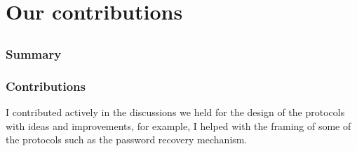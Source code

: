 \documentclass[showtrims,oldfontcommands]{kthesis}
\begin{document}
% 
%
%
%

\chapter{Our contributions}
    \label{chapter:our-contributions}
\renewcommand\thesection{\Alph{section}}
\section{}
\begingroup\centering
\begin{ppBox}
\end{ppBox}
\endgroup

\subsection{Summary}


\subsection{Contributions}
    \label{subsection:contributions-p2p}
I contributed actively in the discussions we held for the design of the protocols 
with ideas and improvements, for example, I helped with the framing of some of the 
protocols such as the password recovery mechanism. 


\section{}
\begingroup\centering
\begin{ppBox}
\end{ppBox}
\endgroup
\end{document}
